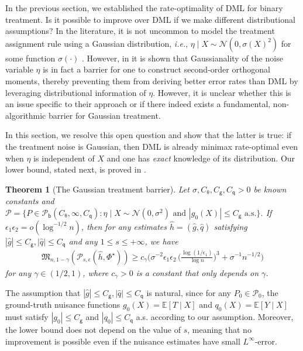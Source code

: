 \documentclass{article}
\def\eps{{\epsilon}}
\def\gN{{\mathcal{N}}}
\def\gP{{\mathcal{P}}}
\newcommand{\E}{\mathbb{E}}
\newcommand{\textfrac}[2]{{\textstyle\frac{#1}{#2}}}
\newtheorem{theorem}{Theorem}[section]
\begin{document}
In the previous section, we established the rate-optimality of DML for binary treatment. Is it possible to improve over DML if we make different distributional assumptions? In the literature, it is not uncommon to model the treatment assignment rule using a Gaussian distribution, \emph{i.e.}, $\eta\mid X \sim \gN(0,\sigma(X)^2)$ for some function $\sigma(\cdot)$ \citep{imai2004causal,zhao2020propensity}. However, in \citet{mackey2018orthogonal} it is shown that Gaussianality of the noise variable $\eta$ is in fact a barrier for one to construct second-order orthogonal moments, thereby preventing them from deriving better error rates than DML by leveraging distributional information of $\eta$. However, it is unclear whether this is an issue specific to their approach or if there indeed exists a fundamental, non-algorithmic barrier for Gaussian treatment.

In this section, we resolve this open question and show that the latter is true: if the treatment noise is Gaussian, then DML is already minimax rate-optimal even when $\eta$ is independent of $X$ and one has \emph{exact} knowledge of its distribution. Our lower bound, stated next, is proved in .

\begin{theorem}[The Gaussian treatment barrier]
    \label{thm:gaussian-lower-bound}
    Let $\sigma, C_{\uptheta},C_{\mathsf{g}},C_{\mathsf{q}} > 0$ be known constants and
    $\gP = \{P\in\gP_{\mathsf{b}}(C_{\uptheta},\infty,C_{\mathsf{q}}): \eta \mid X \sim\gN(0,\sigma^2) \text{ and } |g_0(X)|\leq C_{\mathsf{g}} \text{ a.s.}\}$. If $\eps_1\eps_2=o(\log^{-1/2} n)$, then for any estimates $\hat{h}=(\hat{g},\hat{q})$ satisfying $|\hat{g}|\leq C_{\mathsf{g}}, |\hat{q}|\leq C_{\mathsf{q}}$ and any $1 \leq s \leq +\infty$, we have 
    \begin{align}
    \mathfrak{M}_{n,1-\gamma}\left(\gP_{s,\eps}(\hat{h},\Phi^{\star})\right) \geq  c_{\gamma}\big(\sigma^{-2}\eps_1\eps_2\,\big(\textfrac{\log(1/\eps_1)}{\log n}\big)^3+\sigma^{-1}n^{-1/2}\big) 
    \end{align} 
    for any $\gamma\in(1/2,1)$, where $c_{\gamma}>0$ is a constant that only depends on $\gamma$. 
\end{theorem}

The assumption that $|\hat{g}|\leq C_{\mathsf{g}}, |\hat{q}|\leq C_{\mathsf{q}}$ is natural, since for any $P_0\in\gP_0$, the ground-truth nuisance functions $g_0(X)=\E[T\mid X]$ and $q_0(X)=\E[Y\mid X]$ must satisfy $|g_0|\leq C_{\mathsf{g}}$ and $|q_0|\leq C_{\mathsf{q}}$ a.s. according to our assumption. Moreover, the lower bound does not depend on the value of $s$, meaning that no improvement is possible even if the nuisance estimates have small $L^{\infty}$-error.
\end{document}

